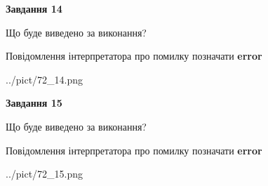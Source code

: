 \documentclass[11pt, ukrainian]{article}
\begin{document}
{\begin {large}
{\begin {center}\textbf{Завдання 14}\end {center}}\par
Що буде виведено за виконання? \par
Повідомлення інтерпретатора про помилку позначати \textbf{error}

\begin{center}
	{../pict/72_14.png}
\end{center}
\newpage

{\begin {center}\textbf{Завдання 15}\end {center}}\par
Що буде виведено за виконання? \par
Повідомлення інтерпретатора про помилку позначати \textbf{error}

\begin{center}
	{../pict/72_15.png}
\end{center}
\newpage

\end {large}}
\end{document}
